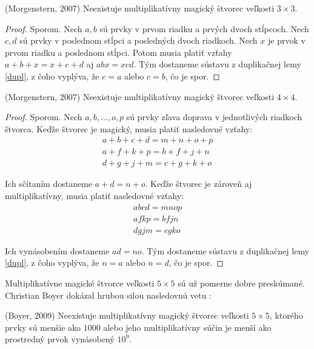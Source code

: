 \begin{theorem} (Morgenstern, 2007) Neexistuje multiplikatívny magický štvorec veľkosti $3 \times 3$.
\end{theorem}

\begin{proof} Sporom. Nech $a,b$ sú prvky v prvom riadku a prvých dvoch stĺpcoch. Nech $c,d$ sú prvky v poslednom stĺpci a posledných dvoch riadkoch. Nech $x$ je prvok v prvom riadku a poslednom stĺpci. Potom musia platiť vzťahy $a + b + x = x + c + d$ aj $abx = xcd$. Tým dostaneme sústavu z duplikačnej lemy \ref{dupl}, z čoho vyplýva, že $c = a$ alebo $c = b$, čo je spor.
\end{proof}

\begin{theorem} (Morgenstern, 2007) Neexistuje multiplikatívny magický štvorec veľkosti $4 \times 4$.
\end{theorem} 

\begin{proof} Sporom. Nech $a, b, \dots , o, p$ sú prvky zľava doprava v jednotlivých riadkoch štvorca. Keďže štvorec je magický, musia platiť nasledovné vzťahy:
\begin{gather*}
a + b + c + d = m + n + o + p \\
a + f + k + p = b + f + j + n \\
d + g + j + m = c + g + k + o
\end{gather*}

Ich sčítaním dostaneme $a + d = n + o$. Keďže štvorec je zároveň aj multiplikatívny, musia platiť nasledovné vzťahy:
\begin{gather*}
abcd = mnop \\
afkp = bfjn \\
dgjm = cgko
\end{gather*}

Ich vynásobením dostaneme $ad = no$. Tým dostaneme sústavu z duplikačnej lemy \ref{dupl}, z čoho vyplýva, že $n = a$ alebo $n = d$, čo je spor.
\end{proof}

Multiplikatívne magické štvorce veľkosti $5 \times 5$ sú už pomerne dobre preskúmané. Christian Boyer dokázal hrubou silou nasledovnú vetu \cite{multimagie}:

\begin{theorem} (Boyer, 2009) Neexistuje multiplikatívny magický štvorec veľkosti $5 \times 5$, ktorého prvky sú menšie ako $1000$ alebo jeho multiplikatívny súčin je menší ako prostredný prvok vynásobený $10^9$.
\end{theorem}

